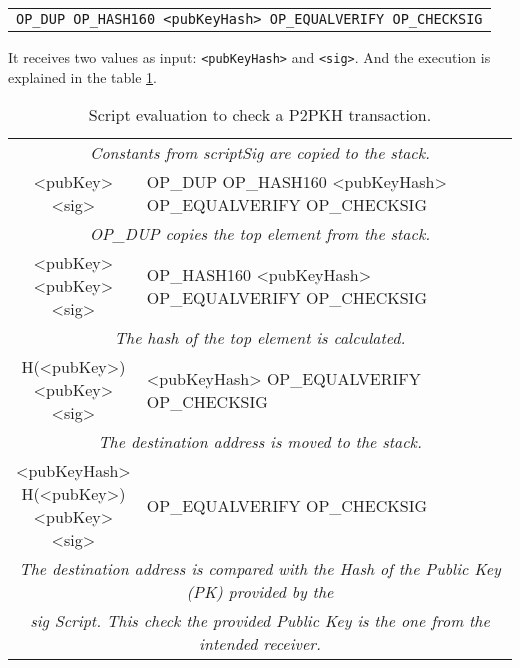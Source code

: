 \begin{center}
	  \begin{tabular}{|c|}
		  \texttt{OP\_DUP OP\_HASH160 <pubKeyHash> OP\_EQUALVERIFY OP\_CHECKSIG}
     \end{tabular}
\end{center}

  It receives two values as input:  \lstinline{<pubKeyHash>} and
  \lstinline{<sig>}. And the execution is explained in the table \ref{tab:p2pkh_exec}.

	\begin{table}[]
		\small
		\caption{Script evaluation to check a P2PKH transaction.}
		\label{tab:p2pkh_exec}
		\begin{tabularx}{\textwidth}{| c | X |}
			\hline
				\thead{Stack} & \thead{Script} \\
			\hline
			\multicolumn{2}{|c|}{\textit{Constants from scriptSig are copied to the stack.}} \\
			\hline
			\makecell{<pubKey>\\<sig>} & OP\_DUP \footnotesize{OP\_HASH160 <pubKeyHash> OP\_EQUALVERIFY OP\_CHECKSIG} \\
			\hline
			\multicolumn{2}{|c|}{\textit{OP\_DUP copies the top element from the stack.}} \\
			\hline
			\makecell{<pubKey> \\ <pubKey> \\ <sig>} & OP\_HASH160 \footnotesize{<pubKeyHash> OP\_EQUALVERIFY OP\_CHECKSIG} \\
			\hline
			\multicolumn{2}{|c|}{\textit{The hash of the top element is calculated.}} \\
			\hline
			\makecell{H(<pubKey>) \\ <pubKey> \\ <sig>} & <pubKeyHash> \footnotesize{OP\_EQUALVERIFY OP\_CHECKSIG} \\
			\hline
			\multicolumn{2}{|c|}{\textit{The destination address is moved to the stack.}} \\
			\hline
			\makecell{<pubKeyHash> \\ H(<pubKey>) \\ <pubKey> \\ <sig>} & OP\_EQUALVERIFY \footnotesize{OP\_CHECKSIG} \\
			\hline
			\multicolumn{2}{|c|}{\textit{The destination address is compared with the Hash of the Public Key (PK) provided by the}} \\
			\multicolumn{2}{|c|}{\textit{sig Script. This check the provided Public Key is the one from the intended receiver.}} \\

\end{tabularx}
\end{table}
